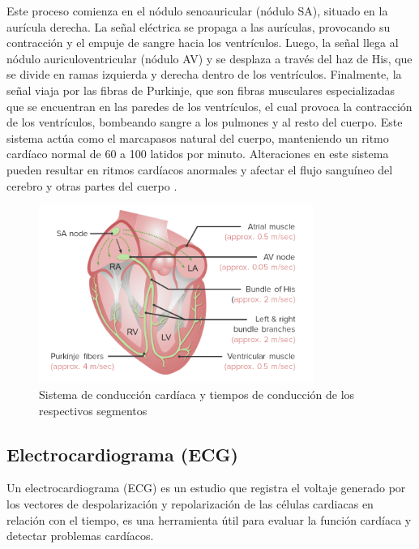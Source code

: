      Este proceso comienza en el nódulo senoauricular (nódulo SA), situado en la aurícula derecha. La señal eléctrica se propaga a las aurículas, provocando su contracción y el empuje de sangre hacia los ventrículos. Luego, la señal llega al nódulo auriculoventricular (nódulo AV) y se desplaza a través del haz de His, que se divide en ramas izquierda y derecha dentro de los ventrículos. Finalmente, la señal viaja por las fibras de Purkinje, que son fibras musculares especializadas que se encuentran en las paredes de los ventrículos, el cual provoca la contracción de los ventrículos, bombeando sangre a los pulmones y al resto del cuerpo. Este sistema actúa como el marcapasos natural del cuerpo, manteniendo un ritmo cardíaco normal de 60 a 100 latidos por minuto. Alteraciones en este sistema pueden resultar en ritmos cardíacos anormales y afectar el flujo sanguíneo del cerebro y otras partes del cuerpo \cite{SistemaConduccionMSD}.

    \begin{figure}[H]
        \centering
        \includegraphics[width=0.8\textwidth]{img/sistemaConduccion.png}
        \caption[Sistema de conducción cardíaca y tiempos de conducción de los respectivos segmentos]{Sistema de conducción cardíaca y tiempos de conducción de los respectivos segmentos\footnotemark}
        \label{fig:sistemaConduccion}
    \end{figure}

    \subsection{Electrocardiograma (ECG)}
    Un electrocardiograma (ECG) es un estudio que registra el voltaje generado por los vectores de despolarización y repolarización de las células cardiacas en relación con el tiempo, es una herramienta útil para evaluar la función cardíaca y detectar problemas cardíacos. \cite{ECG_Definicion}

